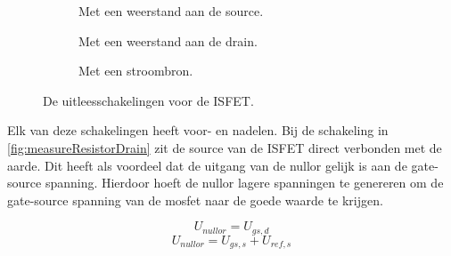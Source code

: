 \begin{figure}[ht]
    \centering
    \begin{subfigure}[b]{0.45\textwidth}
        \centering
        \def\svgwidth{\textwidth}
        
        \caption{Met een weerstand aan de source.}
        \label{fig:measureResistorDrain}
    \end{subfigure}
    \hfill
    \begin{subfigure}[b]{0.45\textwidth}
        \centering
        \def\svgwidth{\textwidth}
        
        \caption{Met een weerstand aan de drain.}
        \label{fig:measureResistorSource}
    \end{subfigure}
    \begin{subfigure}[b]{0.45\textwidth}
        \centering
        \def\svgwidth{\textwidth}
        
        \caption{Met een stroombron.}
        \label{fig:measureCurrent}
    \end{subfigure}
    \caption{De uitleesschakelingen voor de ISFET.}
    \label{fig:measureCircuits}
\end{figure}

Elk van deze schakelingen heeft voor- en nadelen.
Bij de schakeling in \autoref{fig:measureResistorDrain} zit de source van de ISFET direct verbonden met de aarde. Dit heeft als voordeel dat de uitgang van de nullor gelijk is aan de gate-source spanning. Hierdoor hoeft de nullor lagere spanningen te genereren om de gate-source spanning van de mosfet naar de goede waarde te krijgen.

\begin{equation}
    U_{nullor} = U_{gs,d}
\end{equation}
\begin{equation}
    U_{nullor} = U_{gs,s} + U_{ref,s}
\end{equation}